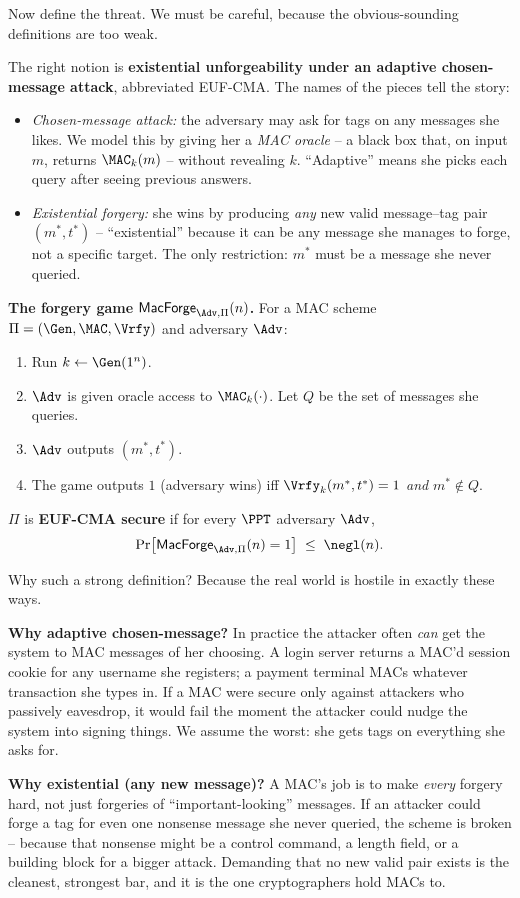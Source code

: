Now define the threat. We must be careful, because the obvious-sounding definitions are too weak.

The right notion is \textbf{existential unforgeability under an adaptive chosen-message attack}, abbreviated EUF-CMA. The names of the pieces tell the story:
\begin{itemize}
  \item \emph{Chosen-message attack:} the adversary may ask for tags on any messages she likes. We model this by giving her a \emph{MAC oracle} -- a black box that, on input $m$, returns $\MAC_k(m)$ -- without revealing $k$. ``Adaptive'' means she picks each query after seeing previous answers.
  \item \emph{Existential forgery:} she wins by producing \emph{any} new valid message--tag pair $(m^*,t^*)$ -- ``existential'' because it can be any message she manages to forge, not a specific target. The only restriction: $m^*$ must be a message she never queried.
\end{itemize}

\begin{formalbox}
\textbf{The forgery game $\mathsf{MacForge}_{\Adv,\Pi}(n)$.} For a MAC scheme $\Pi=(\Gen,\MAC,\Vrfy)$ and adversary $\Adv$:
\begin{enumerate}
  \item Run $k\gets\Gen(1^n)$.
  \item $\Adv$ is given oracle access to $\MAC_k(\cdot)$. Let $Q$ be the set of messages she queries.
  \item $\Adv$ outputs $(m^*,t^*)$.
  \item The game outputs $1$ (adversary wins) iff $\Vrfy_k(m^*,t^*)=1$ \emph{and} $m^*\notin Q$.
\end{enumerate}
$\Pi$ is \textbf{EUF-CMA secure} if for every $\PPT$ adversary $\Adv$,
\[
  \Pr\!\big[\mathsf{MacForge}_{\Adv,\Pi}(n)=1\big] \;\le\; \negl(n).
\]
\end{formalbox}

Why such a strong definition? Because the real world is hostile in exactly these ways.

\begin{whybox}
\textbf{Why adaptive chosen-message?} In practice the attacker often \emph{can} get the system to MAC messages of her choosing. A login server returns a MAC'd session cookie for any username she registers; a payment terminal MACs whatever transaction she types in. If a MAC were secure only against attackers who passively eavesdrop, it would fail the moment the attacker could nudge the system into signing things. We assume the worst: she gets tags on everything she asks for.

\textbf{Why existential (any new message)?} A MAC's job is to make \emph{every} forgery hard, not just forgeries of ``important-looking'' messages. If an attacker could forge a tag for even one nonsense message she never queried, the scheme is broken -- because that nonsense might be a control command, a length field, or a building block for a bigger attack. Demanding that no new valid pair exists is the cleanest, strongest bar, and it is the one cryptographers hold MACs to.
\end{whybox}


